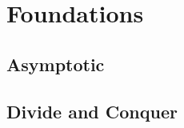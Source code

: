\documentclass[11pt,fleqn]{book} %
\begin{document}
\part{Foundations}


\chapter{Asymptotic}



\chapter{Divide and Conquer}




















\end{document}
